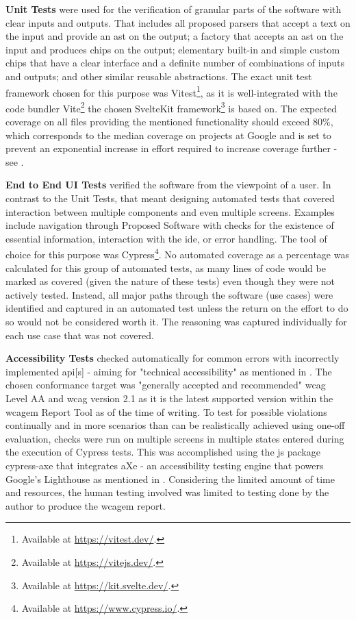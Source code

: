 \textbf{Unit Tests} were used for the verification of granular parts of the software with clear inputs and outputs.
That includes all proposed parsers that accept a text on the input and provide an \gls{ast} on the output; a factory that accepts an \gls{ast} on the input and produces chips on the output; elementary built-in and simple custom chips that have a clear interface and a definite number of combinations of inputs and outputs; and other similar reusable abstractions.
The exact unit test framework chosen for this purpose was Vitest\footnote{Available at \url{https://vitest.dev/}.}, as it is well-integrated with the code bundler Vite\footnote{Available at \url{https://vitejs.dev/}.} the chosen SvelteKit framework\footnote{Available at \url{https://kit.svelte.dev/}.} is based on.
The expected coverage on all files providing the mentioned functionality should exceed 80\%, which corresponds to the median coverage on projects at Google and is set to prevent an exponential increase in effort required to increase coverage further - see .

\textbf{End to End UI Tests} verified the software from the viewpoint of a user.
In contrast to the Unit Tests, that meant designing automated tests that covered interaction between multiple components and even multiple screens.
Examples include navigation through Proposed Software with checks for the existence of essential information, interaction with the \gls{ide}, or error handling.
The tool of choice for this purpose was Cypress\footnote{Available at \url{https://www.cypress.io/}.}.
No automated coverage as a percentage was calculated for this group of automated tests, as many lines of code would be marked as covered (given the nature of these tests) even though they were not actively tested.
Instead, all major paths through the software (use cases) were identified and captured in an automated test unless the return on the effort to do so would not be considered worth it.
The reasoning was captured individually for each use case that was not covered.

\textbf{Accessibility Tests} checked automatically for common errors with incorrectly implemented \gls{api}[s] - aiming for "technical accessibility" as mentioned in .
The chosen conformance target was "generally accepted and recommended" \gls{wcag} Level AA \parencite{WAI_Evaluation_Methodology_Note} and \gls{wcag} version 2.1 as it is the latest supported version within the \gls{wcagem} Report Tool as of the time of writing.
To test for possible violations continually and in more scenarios than can be realistically achieved using one-off evaluation, checks were run on multiple screens in multiple states entered during the execution of Cypress tests.
This was accomplished using the \gls{js} package cypress-axe that integrates aXe - an accessibility testing engine that powers Google's Lighthouse as mentioned in .
Considering the limited amount of time and resources, the human testing involved was limited to testing done by the author to produce the \gls{wcagem} report.

